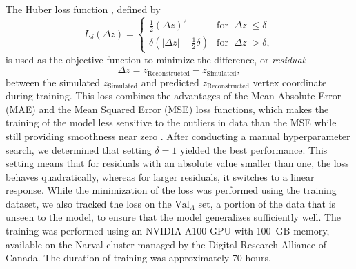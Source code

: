 \documentclass[a4paper,11pt]{article}
\begin{document}
The Huber loss function \cite{robust_regression}, defined by
\begin{equation*}
    \label{eq:huber_loss}
    L_\delta(\Delta z) =
    \begin{cases} 
        \frac{1}{2} (\Delta z)^2 & \text{for } |\Delta z| \leq \delta \\
        \delta (|\Delta z| - \frac{1}{2} \delta) & \text{for } |\Delta z| > \delta,
    \end{cases}
\end{equation*}
is used as the objective function to minimize the difference, or \textit{residual}:
\begin{equation}
    \label{eq:res}
    \Delta z = z_{\mathrm{Reconstructed}} - z_{\mathrm{Simulated}},
\end{equation}    
between the simulated $z_{\mathrm{Simulated}}$ and predicted $z_{\mathrm{Reconstructed}}$ vertex coordinate during training. This loss combines the advantages of the Mean Absolute Error (MAE) and the Mean Squared Error (MSE) loss functions, which makes the training of the model less sensitive to the outliers in data than the MSE while still providing smoothness near zero \cite{pytorch_huber_loss}. After conducting a manual hyperparameter search, we determined that setting $\delta=1$ yielded the best performance. This setting means that for residuals with an absolute value smaller than one, the loss behaves quadratically, whereas for larger residuals, it switches to a linear response. While the minimization of the loss was performed using the training dataset, we also tracked the loss on the $\mathrm{Val}_{A}$ set, a portion of the data that is unseen to the model, to ensure that the model generalizes sufficiently well. The training was performed using an NVIDIA A100 GPU with 100~GB memory, available on the Narval cluster managed by the Digital Research Alliance of Canada. The duration of training was approximately 70 hours. 
\end{document}
